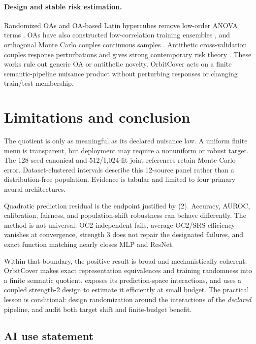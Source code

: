 \documentclass{article}
\begin{document}
\paragraph{Design and stable risk estimation.}
Randomized OAs and OA-based Latin hypercubes remove low-order ANOVA terms
\citep{owen1992oa,ai2016oa}. OAs have also constructed low-correlation
training ensembles \citep{johnson2021ensembles}, and orthogonal Monte Carlo
couples continuous samples \citep{choromanski2019omc}. Antithetic
cross-validation couples response perturbations and gives strong contemporary
risk theory \citep{liu2026antithetic,chattopadhyay2026optimal}. These works
rule out generic OA or antithetic novelty. OrbitCover acts on a finite
semantic-pipeline nuisance product without perturbing responses or changing
train/test membership.

\section{Limitations and conclusion}

The quotient is only as meaningful as its declared nuisance law. A uniform
finite menu is transparent, but deployment may require a nonuniform or robust
target. The 128-seed canonical and 512/1,024-fit joint references retain Monte
Carlo error. Dataset-clustered intervals describe this 12-source panel rather
than a distribution-free population. Evidence is tabular and limited to four
primary neural architectures.

Quadratic prediction residual is the endpoint justified by (2). Accuracy,
AUROC, calibration, fairness, and population-shift robustness can behave
differently. The method is not universal: OC2-independent fails, average
OC2/SRS efficiency vanishes at convergence, strength 3 does not repair the
designated failures, and exact function matching nearly closes MLP and ResNet.

Within that boundary, the positive result is broad and mechanistically
coherent. OrbitCover makes exact representation equivalences and training
randomness into a finite semantic quotient, exposes its prediction-space
interactions, and uses a coupled strength-2 design to estimate it efficiently
at small budget. The practical lesson is conditional: design randomization
around the interactions of the \emph{declared} pipeline, and audit both target
shift and finite-budget benefit.

\subsection*{AI use statement}
\end{document}
